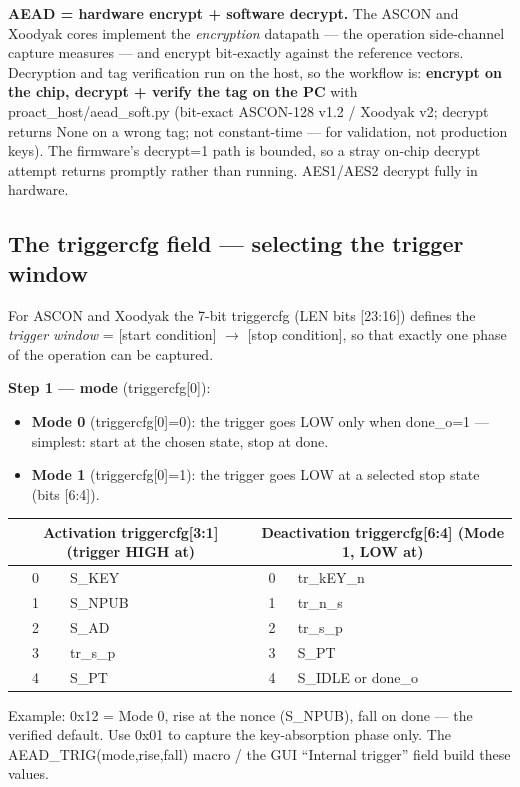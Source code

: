 \documentclass[11pt,a4paper]{report}
\newcommand{\code}[1]{{\ttfamily\small #1}}
\begin{document}
\begin{notebox}
\textbf{AEAD = hardware encrypt + software decrypt.} The ASCON and Xoodyak cores
implement the \emph{encryption} datapath --- the operation side-channel capture
measures --- and encrypt bit-exactly against the reference vectors. Decryption
and tag verification run on the host, so the workflow is: \textbf{encrypt on the
chip, decrypt + verify the tag on the PC} with \code{proact\_host/aead\_soft.py}
(bit-exact ASCON-128 v1.2 / Xoodyak v2; decrypt returns \code{None} on a wrong
tag; not constant-time --- for validation, not production keys). The firmware's
\code{decrypt=1} path is bounded, so a stray on-chip decrypt attempt returns
promptly rather than running. AES1/AES2 decrypt fully in hardware.
\end{notebox}

\subsection*{The \code{triggercfg} field --- selecting the trigger window}
For ASCON and Xoodyak the 7-bit \code{triggercfg} (LEN bits [23:16]) defines the
\emph{trigger window} = [start condition] $\rightarrow$ [stop condition], so that
exactly one phase of the operation can be captured.

\textbf{Step 1 --- mode} (\code{triggercfg[0]}):
\begin{itemize}[nosep,leftmargin=1.4em]
\item \textbf{Mode 0} (\code{triggercfg[0]=0}): the trigger goes LOW only when
\code{done\_o=1} --- simplest: start at the chosen state, stop at done.
\item \textbf{Mode 1} (\code{triggercfg[0]=1}): the trigger goes LOW at a
selected stop state (bits [6:4]).
\end{itemize}

\begin{center}
\begin{tabular}{cl@{\hskip 1.5cm}cl}
\toprule
\multicolumn{2}{c}{Activation \code{triggercfg[3:1]} (trigger HIGH at)} &
\multicolumn{2}{c}{Deactivation \code{triggercfg[6:4]} (Mode 1, LOW at)} \\ \midrule
0 & \code{S\_KEY} & 0 & \code{tr\_kEY\_n} \\
1 & \code{S\_NPUB} & 1 & \code{tr\_n\_s} \\
2 & \code{S\_AD} & 2 & \code{tr\_s\_p} \\
3 & \code{tr\_s\_p} & 3 & \code{S\_PT} \\
4 & \code{S\_PT} & 4 & \code{S\_IDLE} or \code{done\_o} \\
\bottomrule
\end{tabular}\end{center}
Example: \code{0x12} = Mode 0, rise at the nonce (\code{S\_NPUB}), fall on done ---
the verified default. Use \code{0x01} to capture the key-absorption phase only.
The \code{AEAD\_TRIG(mode,rise,fall)} macro / the GUI ``Internal trigger''
field build these values.
\end{document}
